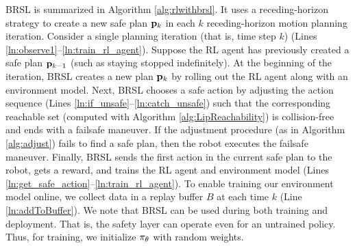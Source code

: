 BRSL is summarized in Algorithm \ref{alg:rlwithbrsl}.
It uses a receding-horizon strategy to create a new safe plan ${\mathbf{p}}_k$ in each $k$ receding-horizon motion planning iteration.
Consider a single planning iteration (that is, time step $k$) (Lines \ref{ln:observe1}--\ref{ln:train_rl_agent}).
Suppose the RL agent has previously created a safe plan ${\mathbf{p}}_{k-1}$ (such as staying stopped indefinitely).
At the beginning of the iteration, BRSL creates a new plan ${\mathbf{p}}_k$ by rolling out the RL agent along with an environment model. %
Next, BRSL chooses a safe action by adjusting the  action sequence (Lines \ref{ln:if_unsafe}--\ref{ln:catch_unsafe}) such that the corresponding reachable set (computed with Algorithm \ref{alg:LipReachability}) is collision-free and ends with a failsafe maneuver. 
If the adjustment procedure (as in Algorithm \ref{alg:adjust}) fails to find a safe plan, then the robot executes the  failsafe maneuver.
Finally, BRSL sends the first action in the current safe plan to the robot, gets a reward, and trains the RL agent and environment model (Lines \ref{ln:get_safe_action}--\ref{ln:train_rl_agent}). 
To enable training our environment model online, we collect data in a replay buffer $B$ at each time $k$ (Line \ref{ln:addToBuffer}).
We note that BRSL can be used during both training and deployment.
That is, the safety layer can operate even for an untrained policy.
Thus, for training, we initialize $\pi_\theta$ with random weights.


%




